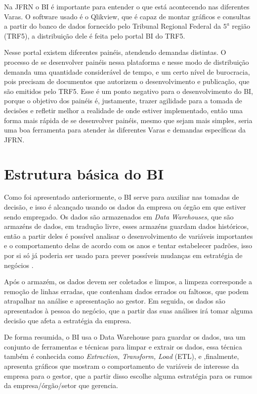 Na JFRN o BI é importante para entender o que está acontecendo nas diferentes Varas. O software usado é o Qlikview, que é capaz de montar gráficos e consultas a partir do banco de dados fornecido pelo Tribunal Regional Federal da $5^{a}$ região (TRF5), a distribuição dele é feita pelo portal BI do TRF5.

Nesse portal existem diferentes painéis, atendendo demandas distintas. O processo de se desenvolver painéis nessa plataforma e nesse modo de distribuição demanda uma quantidade considerável de tempo, e um certo nível de burocracia, pois precisam de documentos que autorizem o desenvolvimento e publicação, que são emitidos pelo TRF5. Esse é um ponto negativo para o desenvolvimento do BI, porque o objetivo dos painéis é, justamente, trazer agilidade para a tomada de decisões e refletir melhor a realidade de onde estiver implementado, então uma forma mais rápida de se desenvolver painéis, mesmo que sejam mais simples, seria uma boa ferramenta para atender às diferentes Varas e demandas específicas da JFRN.



\section{Estrutura básica do BI}


Como foi apresentado anteriormente, o BI serve para auxiliar nas tomadas de decisão, e isso é alcançado usando os dados da empresa ou órgão em que estiver sendo empregado. Os dados são armazenados em \textit{Data Warehouses}, que são armazéns de dados, em tradução livre, esses armazéns guardam dados históricos, então a partir deles é possível analisar o desenvolvimento de variáveis importantes e o comportamento delas de acordo com os anos e tentar estabelecer padrões, isso por si só já poderia ser usado para prever possíveis mudanças em estratégia de negócios \cite{negash1}.

Após o armazém, os dados devem ser coletados e limpos, a limpeza corresponde a remoção de linhas erradas, que contenham dados errados ou faltosos, que podem atrapalhar na análise e apresentação ao gestor. Em seguida, os dados são apresentados à pessoa do negócio, que a partir das suas análises irá tomar alguma decisão que afeta a estratégia da empresa. 

De forma resumida, o BI usa o Data Warehouse para guardar os dados, usa um conjunto de ferramentas e técnicas para limpar e extrair os dados, essa técnica também é conhecida como \textit{Extraction, Transform, Load} (ETL), e ,finalmente, apresenta gráficos que mostram o comportamento de variáveis de interesse da empresa para o gestor, que a partir disso escolhe alguma estratégia para os rumos da empresa/órgão/setor que gerencia.

